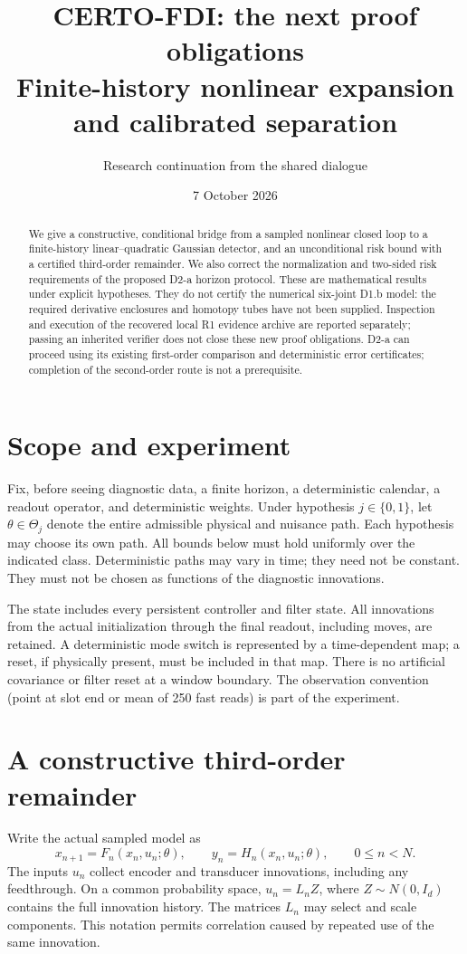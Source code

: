 \documentclass[11pt]{article}
\title{CERTO-FDI: the next proof obligations\\Finite-history nonlinear expansion and calibrated separation}
\author{Research continuation from the shared dialogue}
\date{7 October 2026}
\theoremstyle{remark}\newtheorem{remark}[theorem]{Remark}
\begin{document}
\maketitle
\begin{abstract}
We give a constructive, conditional bridge from a sampled nonlinear closed loop to a finite-history linear--quadratic Gaussian detector, and an unconditional risk bound with a certified third-order remainder. We also correct the normalization and two-sided risk requirements of the proposed D2-a horizon protocol. These are mathematical results under explicit hypotheses. They do not certify the numerical six-joint D1.b model: the required derivative enclosures and homotopy tubes have not been supplied. Inspection and execution of the recovered local R1 evidence archive are reported separately; passing an inherited verifier does not close these new proof obligations. D2-a can proceed using its existing first-order comparison and deterministic error certificates; completion of the second-order route is not a prerequisite.
\end{abstract}

\section{Scope and experiment}
Fix, before seeing diagnostic data, a finite horizon, a deterministic calendar, a readout operator, and deterministic weights. Under hypothesis $j\in\{0,1\}$, let $\theta\in\Theta_j$ denote the entire admissible physical and nuisance path. Each hypothesis may choose its own path. All bounds below must hold uniformly over the indicated class. Deterministic paths may vary in time; they need not be constant. They must not be chosen as functions of the diagnostic innovations.

The state includes every persistent controller and filter state. All innovations from the actual initialization through the final readout, including moves, are retained. A deterministic mode switch is represented by a time-dependent map; a reset, if physically present, must be included in that map. There is no artificial covariance or filter reset at a window boundary. The observation convention (point at slot end or mean of 250 fast reads) is part of the experiment.

\section{A constructive third-order remainder}
Write the actual sampled model as
\begin{equation}\label{eq:model}
 x_{n+1}=F_n(x_n,u_n;\theta),\qquad
 y_n=H_n(x_n,u_n;\theta),\qquad 0\le n<N.
\end{equation}
The inputs $u_n$ collect encoder and transducer innovations, including any feedthrough. On a common probability space, $u_n=L_n Z$, where $Z\sim N(0,I_d)$ contains the full innovation history. The matrices $L_n$ may select and scale components. This notation permits correlation caused by repeated use of the same innovation.
\end{document}
